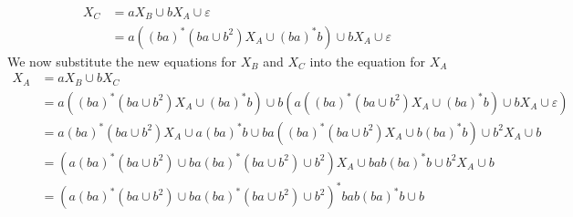 \begin{solution}
\begin{enumerate}[(a)]
\begin{align*}
        X_C &= aX_B\cup bX_A\cup\varepsilon \\
            &= a({(ba)}^*(ba\cup b^2)X_A\cup {(ba)}^*b)\cup bX_A\cup\varepsilon
    \end{align*}
    We now substitute the new equations for \(X_B\) and \(X_C\) into the equation for \(X_A\)
    \begin{align*}
        X_A &= aX_B\cup bX_C\\
            &= a({(ba)}^*(ba\cup b^2)X_A\cup {(ba)}^*b)\cup b(a({(ba)}^*(ba\cup b^2)X_A\cup {(ba)}^*b)\cup bX_A\cup\varepsilon)\\
            &= a{(ba)}^*(ba\cup b^2)X_A\cup a{(ba)}^*b\cup ba({(ba)}^*(ba\cup b^2)X_A\cup b{(ba)}^*b)\cup b^2X_A\cup b\\
            &= (a{(ba)}^*(ba\cup b^2)\cup ba{(ba)}^*(ba\cup b^2)\cup b^2)X_A\cup bab{(ba)}^*b\cup b^2X_A\cup b\\
            &= {(a{(ba)}^*(ba\cup b^2)\cup ba{(ba)}^*(ba\cup b^2)\cup b^2)}^* bab{(ba)}^*b\cup b
    \end{align*}
    \end{enumerate}
\end{solution}

